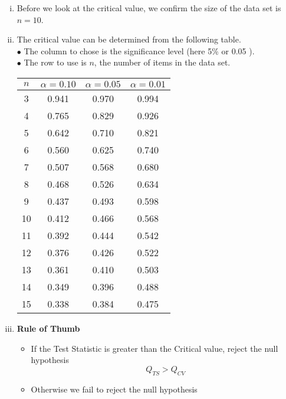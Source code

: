 \documentclass[]{article}
\begin{document}
\begin{enumerate}[(i)]
\newpage
\item Before we look at the critical value, we confirm the size of the data set is $n=10$.

\item  The critical value can be determined from the following table. \\ $\bullet$ The column to chose is the significance level (here 5\% or 0.05 ).
\\ $\bullet$ The row to use is $n$, the number of items in the data set.
\bigskip

{
\huge
\begin{tabular}{|c|c|c|c|}
\hline
$n$	&	$\alpha=0.10$	&	$\alpha=0.05$	&	$\alpha=0.01$	\\ \hline
3	&	0.941	&	0.970	&	0.994	\\ \hline
4	&	0.765	&	0.829	&	0.926	\\ \hline
5	&	0.642	&	0.710	&	0.821	\\ \hline
6	&	0.560	&	0.625	&	0.740	\\ \hline
7	&	0.507	&	0.568	&	0.680	\\ \hline
8	&	0.468	&	0.526	&	0.634	\\ \hline
9	&	0.437	&	0.493	&	0.598	\\ \hline
10	&	0.412	&	0.466	&	0.568	\\ \hline
11	&	0.392	&	0.444	&	0.542	\\ \hline
12	&	0.376	&	0.426	&	0.522	\\ \hline
13	&	0.361	&	0.410	&	0.503	\\ \hline
14	&	0.349	&	0.396	&	0.488	\\ \hline
15	&	0.338	&	0.384	&	0.475	\\ \hline

\end{tabular} 

}
\newpage

\item \textbf{Rule of Thumb}

\begin{framed}
\begin{itemize}
\item If the Test Statistic is greater than the Critical value, reject the null hypothesis
\[ Q_{TS} > Q_{CV}\]

\item Otherwise we fail to reject the null hypothesis

\end{itemize}
\end{framed}
\end{enumerate}
\end{document}
